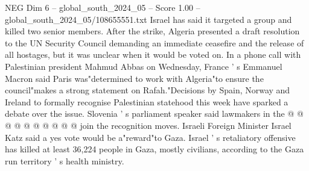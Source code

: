 \begin{textsample}{NEG Dim 6 – global\_south\_2024\_05 – Score 1.00 – global\_south\_2024\_05/108655551.txt}
Israel has said it targeted a group and killed two senior members.
After the strike, Algeria presented a draft resolution to the UN Security Council demanding an immediate ceasefire and the release of all hostages, but it was unclear when it would be voted on.
In a phone call with Palestinian president Mahmud Abbas on Wednesday, France ' s Emmanuel Macron said Paris was"determined to work with Algeria"to ensure the council"makes a strong statement on Rafah."Decisions by Spain, Norway and Ireland to formally recognise Palestinian statehood this week have sparked a debate over the issue.
Slovenia ' s parliament speaker said lawmakers in the @ @ @ @ @ @ @ @ @ @ join the recognition moves.
Israeli Foreign Minister Israel Katz said a yes vote would be a"reward"to Gaza.
Israel ' s retaliatory offensive has killed at least 36,224 people in Gaza, mostly civilians, according to the Gaza run territory ' s health ministry.

\end{textsample}
